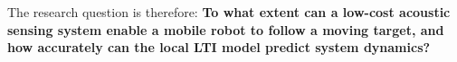The research question is therefore: \textbf{To what extent can a low-cost acoustic sensing system enable a mobile robot to follow a moving target, and how accurately can the local LTI model predict system dynamics?}

